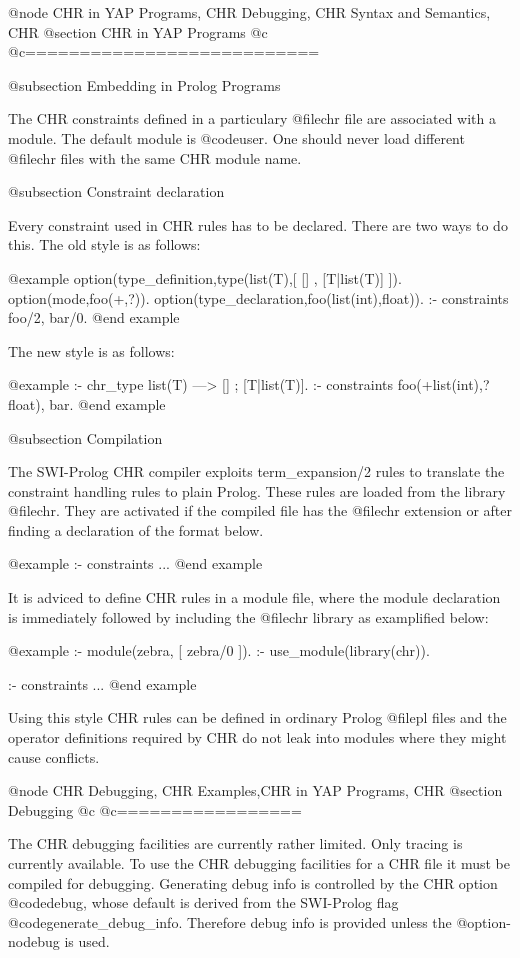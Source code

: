 {@node CHR in YAP Programs, CHR Debugging, CHR Syntax and Semantics, CHR
@section CHR in YAP Programs	
@c	\label{sec:practical}
@c===========================


@subsection Embedding in Prolog Programs

The CHR constraints defined in a particulary @file{chr} file are
associated with a module. The default module is @code{user}. One should
never load different @file{chr} files with the same CHR module name.

@subsection Constraint declaration

Every constraint used in CHR rules has to be declared.
There are two ways to do this. The old style is as follows:

@example
option(type_definition,type(list(T),[ [] , [T|list(T)] ]).
option(mode,foo(+,?)).
option(type_declaration,foo(list(int),float)).
:- constraints foo/2, bar/0.
@end example

The new style is as follows:

@example
:- chr_type list(T) ---> [] ; [T|list(T)].
:- constraints foo(+list(int),?float), bar.
@end example


@subsection Compilation

The SWI-Prolog CHR compiler exploits term_expansion/2 rules to translate
the constraint handling rules to plain Prolog. These rules are loaded
from the library @file{chr}.   They are activated if the compiled file
has the @file{chr} extension or after finding a declaration of the
format below.

@example
:- constraints ...
@end example

It is adviced to define CHR rules in a module file, where the module
declaration is immediately followed by including the @file{chr}
library as examplified below:

@example
:- module(zebra, [ zebra/0 ]).
:- use_module(library(chr)).

:- constraints ...
@end example

Using this style CHR rules can be defined in ordinary Prolog
@file{pl} files and the operator definitions required by CHR do not
leak into modules where they might cause conflicts.


@node CHR Debugging, CHR Examples,CHR in YAP Programs, CHR
@section Debugging
@c			\label{sec:debugging}
@c=================

The CHR debugging facilities are currently rather limited. Only tracing
is currently available. To use the CHR debugging facilities for a CHR
file it must be compiled for debugging. Generating debug info is
controlled by the CHR option @code{debug}, whose default is derived
from the SWI-Prolog flag @code{generate_debug_info}.  Therefore debug
info is provided unless the @option{-nodebug} is used.


}
